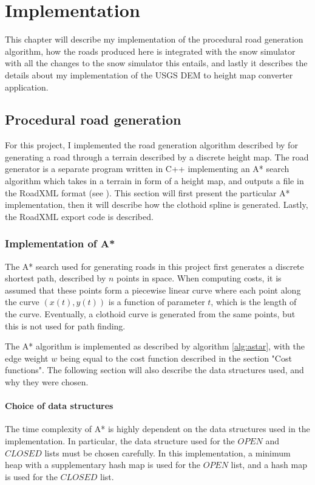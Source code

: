 \chapter{Implementation}
\label{chap:implementation}
This chapter will describe my implementation of the procedural road generation algorithm, how the roads produced here is integrated with the snow simulator with all the changes to the snow simulator this entails, and lastly it describes the details about my implementation of the USGS DEM to height map converter application.

\section{Procedural road generation}
\label{sec:impl_procroad}
For this project, I implemented the road generation algorithm described by \cite{roadgen} for generating a road through a terrain described by a discrete height map. The road generator is a separate program written in C++ implementing an A* search algorithm which takes in a terrain in form of a height map, and outputs a file in the RoadXML format (see \cite{roadxml}). This section will first present the particular A* implementation, then it will describe how the clothoid spline is generated. Lastly, the RoadXML export code is described. 

\subsection{Implementation of A*}
\label{sec:impl_astar}
The A* search used for generating roads in this project first generates a discrete shortest path, described by $n$ points in space. When computing costs, it is assumed that these points form a piecewise linear curve where each point along the curve $(x(t), y(t))$ is a function of parameter $t$, which is the length of the curve. Eventually, a clothoid curve is generated from the same points, but this is not used for path finding.

The A* algorithm is implemented as described by algorithm \ref{alg:astar}, with the edge weight $w$ being equal to the cost function described in the section "Cost functions". The following section will also describe the data structures used, and why they were chosen. 

\subsubsection{Choice of data structures}
The time complexity of A* is highly dependent on the data structures used in the implementation. In particular, the data structure used for the $OPEN$ and $CLOSED$ lists must be chosen carefully. In this implementation, a minimum heap with a supplementary hash map is used for the $OPEN$ list, and a hash map is used for the $CLOSED$ list.

